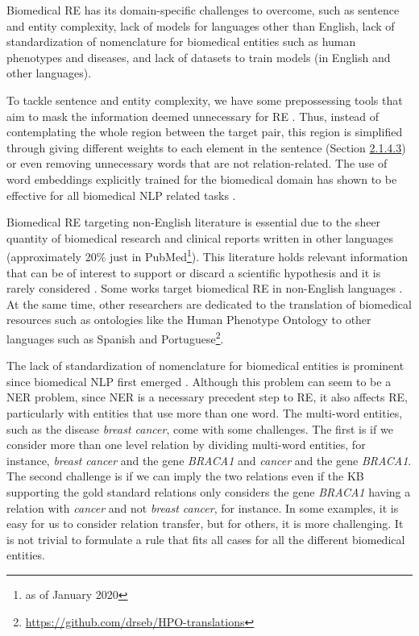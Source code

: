 Biomedical RE has its domain-specific challenges to overcome, such as sentence and entity complexity, lack of models for languages other than English, lack of standardization of nomenclature for biomedical entities such as human phenotypes and diseases, and lack of datasets to train models (in English and other languages). 

To tackle sentence and entity complexity, we have some prepossessing tools that aim to mask the information deemed unnecessary for RE \citep{miwa2010entity,lee2020biobert}. Thus, instead of contemplating the whole region between the target pair, this region is simplified through giving different weights to each element in the sentence (Section \hyperlink{2.1.4.3}{2.1.4.3}) or even removing unnecessary words that are not relation-related. The use of word embeddings explicitly trained for the biomedical domain has shown to be effective for all biomedical NLP related tasks \citep{lee2020biobert,Beltagy2019SciBERT}.

Biomedical RE targeting non-English literature is essential due to the sheer quantity of biomedical research and clinical reports written in other languages (approximately 20\% just in PubMed\footnote{as of January 2020}). This literature holds relevant information that can be of interest to support or discard a scientific hypothesis \citep{nussbaumer2020excluding} and it is rarely considered \citep{di2017publish}. Some works target biomedical RE in non-English languages \citep{6103454}. At the same time, other researchers are dedicated to the translation of biomedical resources such as ontologies like the Human Phenotype Ontology to other languages such as Spanish and Portuguese\footnote{\url{https://github.com/drseb/HPO-translations}}. 

The lack of standardization of nomenclature for biomedical entities is prominent since biomedical NLP first emerged \citep{leser2005makes,horwitz2011naming}. Although this problem can seem to be a NER problem, since NER is a necessary precedent step to RE, it also affects RE, particularly with entities that use more than one word. The multi-word entities, such as the disease \textit{breast cancer}, come with some challenges. The first is if we consider more than one level relation by dividing multi-word entities, for instance, \textit{breast cancer} and the gene \textit{BRACA1} and \textit{cancer} and the gene \textit{BRACA1}. The second challenge is if we can imply the two relations even if the KB supporting the gold standard relations only considers the gene \textit{BRACA1} having a relation with \textit{cancer} and not \textit{breast cancer}, for instance. In some examples, it is easy for us to consider relation transfer, but for others, it is more challenging. It is not trivial to formulate a rule that fits all cases for all the different biomedical entities. 

